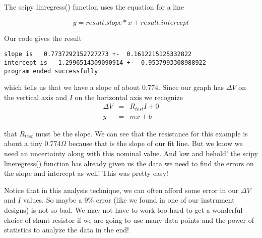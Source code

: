 The scipy linregress() function uses the equation for a line 

\begin{equation*}
	y = result.slope*x + result.intercept
\end{equation*}

\noindent Our code gives the result

\begin {verbatim}
slope is   0.7737292152727273 +-  0.1612215125332822
intercept is   1.2996514309090914 +-  0.9537993308988922
program ended successfully
\end{verbatim}

\noindent which tells us that we have a slope of about $0.774.$ Since our graph
has $\Delta V$ on the vertical axis and $I$ on the horizontal axis we
recognize 
\begin{eqnarray*}
	\Delta V &=&R_{test}I+0 \\
           y &=&mx+b
\end{eqnarray*}

that $R_{test}$ must be the slope. We can see that the resistance for this example is about a tiny $0.774\unit{\Omega}$ because that is the slope of our fit line. But we know we need an uncertainty along with this nominal value. And low and behold! the scipy lineregress() function has already given us the data we need to find the errors on the slope and intercept as well! This was pretty easy!

Notice that in this analysis technique, we can often afford some error in our 
$\Delta V$ and $I$ values. So maybe a $9\%$ error (like we found in one of
our instrument designs) is not so bad. We may not have to work too hard to
get a wonderful choice of shunt resistor if we are going to use many data
points and the power of statistics to analyze the data in the end!
